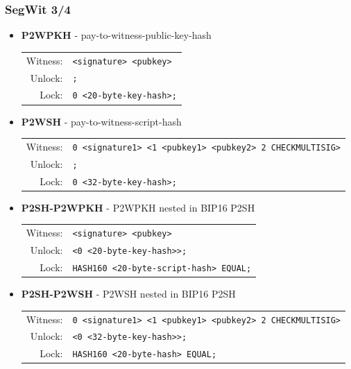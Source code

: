 \documentclass{beamer}
\begin{document}
\begin{frame}
  \frametitle{SegWit 3/4}
  \begin{itemize}
  \item \textbf{P2WPKH} - pay-to-witness-public-key-hash
    \break
    \begin{tabular}{rl}
      Witness: &\tiny\texttt{<signature> <pubkey>} \\
      Unlock: &\tiny\texttt{;} \\
      Lock: &\tiny\texttt{0 <20-byte-key-hash>;} \\
    \end{tabular}
  \item \textbf{P2WSH} - pay-to-witness-script-hash
    \break
    \begin{tabular}{rl}
      Witness: &\tiny\texttt{0 <signature1> <1 <pubkey1> <pubkey2> 2 CHECKMULTISIG>} \\
      Unlock: &\tiny\texttt{;} \\
      Lock: &\tiny\texttt{0 <32-byte-key-hash>;} \\
    \end{tabular}
  \item \textbf{P2SH-P2WPKH} - P2WPKH nested in BIP16 P2SH
    \break
    \begin{tabular}{rl}
      Witness: &\tiny\texttt{<signature> <pubkey>} \\
      Unlock: &\tiny\texttt{<0 <20-byte-key-hash>>;} \\
      Lock: &\tiny\texttt{HASH160 <20-byte-script-hash> EQUAL;} \\
    \end{tabular}
  \item \textbf{P2SH-P2WSH} - P2WSH nested in BIP16 P2SH
    \break
    \begin{tabular}{rl}
      Witness: &\tiny\texttt{0 <signature1> <1 <pubkey1> <pubkey2> 2 CHECKMULTISIG>} \\
      Unlock: &\tiny\texttt{<0 <32-byte-key-hash>>;} \\
      Lock: &\tiny\texttt{HASH160 <20-byte-hash> EQUAL;} \\
    \end{tabular}
  \end{itemize}
\end{frame}
\end{document}
